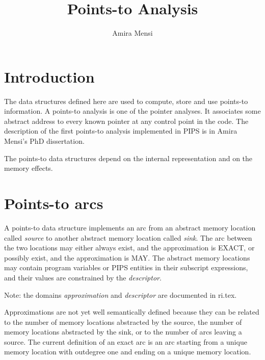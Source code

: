 \documentclass{article}
\title{Points-to Analysis}
\author{Amira Mensi}
\begin{document}
\maketitle

\section{Introduction}

The data structures defined here are used to compute, store and use
points-to information. A points-to analysis is one of the pointer
analyses. It associates some abstract address to every known pointer
at any control point in the code. The description of the first
points-to analysis implemented in PIPS is in Amira Mensi's PhD
dissertation.

The points-to data structures depend on the internal representation
and on the memory effects.

{}
{}
{}
{}

 

\section{Points-to arcs}
 
A points-to data structure implements an arc from an abstract memory location
called {\em source} to another abstract memory location called
{\em sink}. The arc between the two locations may either always exist,
and the approximation is EXACT, or possibly exist, and the
approximation is MAY. The abstract memory locations may contain
program variables or PIPS entities in their subscript expressions, and
their values are constrained by the {\em descriptor}.

{}

Note: the domains {\em approximation} and {\em descriptor} are
documented in ri.tex.

Approximations are not yet well semantically defined because they can
be related to the number of memory locations abstracted by the source,
the number of memory locations abstracted by the sink, or to the
number of arcs leaving a source. The current definition of an exact
arc is an arc starting from a unique memory location with outdegree
one and ending on a unique memory location.
\end{document}
